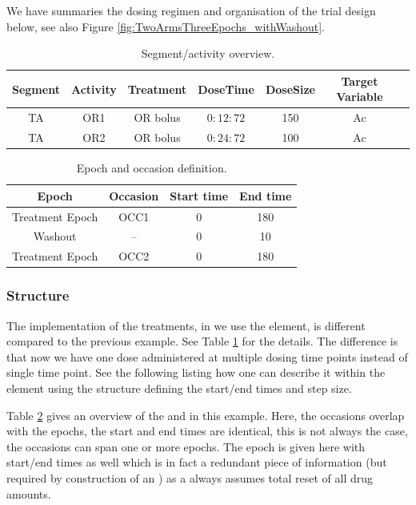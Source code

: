 We have summaries the dosing regimen and organisation of the trial
design below, see also Figure \ref{fig:TwoArmsThreeEpochs_withWashout}.

\begin{table}[htdp!]
\begin{center}
\begin{tabular}{ccccccc}
\hline
Segment&Activity & Treatment & DoseTime & DoseSize & Target Variable \\
\hline
TA& OR1 &  OR bolus & $0:12:72$ & 150 & Ac \\
TA& OR2 &  OR bolus & $0:24:72$ & 100 & Ac \\
\hline
\end{tabular}
\end{center}
\caption{Segment/activity overview.}
\label{fig:eg6:segmentCellArmEpoch}
\end{table}

\begin{table}[htdp!]
\begin{center}
\begin{tabular}{cccc}
\hline
Epoch & Occasion & Start time & End time \\
\hline
Treatment Epoch & OCC1 & 0 &  180  \\
Washout & -- & 0 &  10  \\
Treatment Epoch & OCC2 & 0 &  180  \\
\hline
\end{tabular}
\end{center}
\caption{Epoch and occasion definition.}
\label{fig:eg6:epochDef}
\end{table}


\subsubsection{Structure}
The implementation of the treatments, in \pharmml we use the
 element, is different compared to the previous example. 
See Table \ref{fig:eg6:segmentCellArmEpoch} for the details. The difference
is that now we have one dose administered at multiple dosing time points 
instead of single time point. See the following listing 
how one can describe it within the  element using the 
structure defining the start/end times and step size.

Table \ref{fig:eg6:epochDef} gives an overview of the  and  
in this example. Here, the occasions overlap with the epochs, the start and end times 
are identical, this is not always the case, the occasions can span one or more epochs. 
The  epoch is given here with start/end times as well which is in fact 
a redundant piece of information (but required by construction of an )
as a  always assumes total reset of all drug amounts. 

